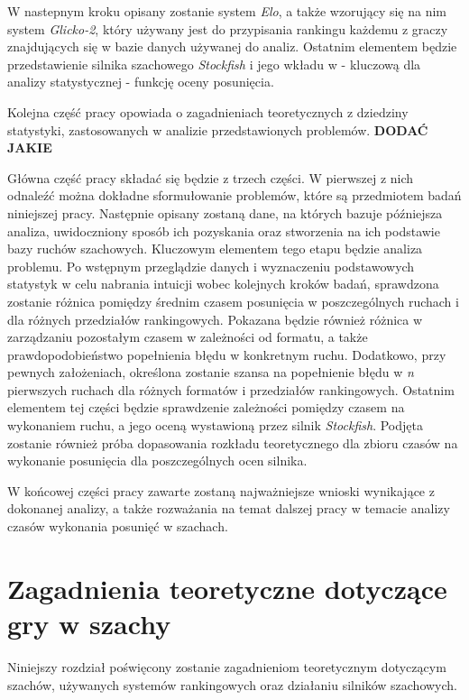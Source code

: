 \documentclass[inzynierska]{pwr_wmat_praca_dyplomowa}
\theoremstyle{plain}
\numberwithin{theorem}{chapter}
\theoremstyle{definition}
\numberwithin{theorem}{chapter}
\begin{document}
W nastepnym kroku opisany zostanie system \textit{Elo}, a także wzorujący się na nim system \textit{Glicko-2}, który używany jest do przypisania rankingu każdemu z graczy znajdujących się w bazie danych używanej do analiz. Ostatnim elementem będzie przedstawienie  silnika szachowego \textit{Stockfish} i jego wkładu w - kluczową dla analizy statystycznej - funkcję oceny posunięcia.


Kolejna część pracy opowiada o zagadnieniach teoretycznych z dziedziny statystyki, zastosowanych w analizie przedstawionych problemów. \textbf{DODAĆ JAKIE}
 
 
Główna część pracy składać się będzie z trzech części. W pierwszej z nich odnaleźć można dokładne sformułowanie problemów, które są przedmiotem badań niniejszej pracy. Następnie opisany zostaną dane, na których bazuje późniejsza analiza,  uwidoczniony sposób ich pozyskania oraz stworzenia na ich podstawie bazy ruchów szachowych. Kluczowym elementem tego etapu będzie analiza problemu. Po wstępnym przeglądzie danych i wyznaczeniu podstawowych statystyk w celu nabrania intuicji wobec kolejnych kroków badań, sprawdzona zostanie różnica pomiędzy średnim czasem posunięcia w poszczególnych ruchach i dla różnych przedziałów rankingowych. Pokazana będzie również różnica w zarządzaniu pozostałym czasem w zależności od formatu, a także prawdopodobieństwo popełnienia błędu w konkretnym ruchu. Dodatkowo, przy pewnych założeniach, określona zostanie szansa na popełnienie błędu w \textit{n} pierwszych ruchach dla różnych formatów i przedziałów rankingowych. Ostatnim elementem tej części będzie sprawdzenie zależności pomiędzy czasem na wykonaniem ruchu, a jego oceną wystawioną przez silnik \textit{Stockfish}. Podjęta zostanie również próba dopasowania rozkładu teoretycznego dla zbioru czasów na wykonanie posunięcia dla poszczególnych ocen silnika.


W końcowej części pracy zawarte zostaną najważniejsze wnioski wynikające z dokonanej analizy, a także rozważania na temat dalszej pracy w temacie analizy czasów wykonania posunięć w szachach.

\chapter{Zagadnienia teoretyczne dotyczące gry w szachy}
Niniejszy rozdział poświęcony zostanie zagadnieniom teoretycznym dotyczącym szachów, używanych systemów rankingowych oraz działaniu silników szachowych.
\end{document}
